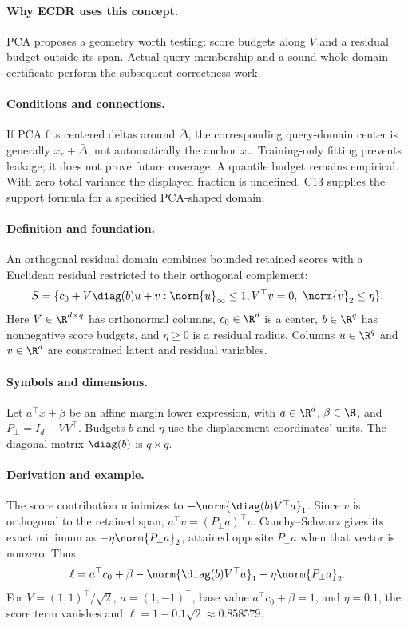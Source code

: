 \paragraph{Why ECDR uses this concept.}
PCA proposes a geometry worth testing: score budgets along $V$ and a residual budget outside its span. Actual query membership and a sound whole-domain certificate perform the subsequent correctness work.
\paragraph{Conditions and connections.}
If PCA fits centered deltas around $\bar\Delta$, the corresponding query-domain center is generally $x_r+\bar\Delta$, not automatically the anchor $x_r$. Training-only fitting prevents leakage; it does not prove future coverage. A quantile budget remains empirical. With zero total variance the displayed fraction is undefined. C13 supplies the support formula for a specified PCA-shaped domain.

\paragraph{Definition and foundation.}
An orthogonal residual domain combines bounded retained scores with a Euclidean residual restricted to their orthogonal complement:
\[
 S=\{c_0+V\diag(b)u+v:\norm{u}_\infty\le1,
          V^\top v=0,\ \norm{v}_2\le\eta\}.
\]
Here $V\in\R^{d\times q}$ has orthonormal columns, $c_0\in\R^d$ is a center, $b\in\R^q$ has nonnegative score budgets, and $\eta\ge0$ is a residual radius. Columns $u\in\R^q$ and $v\in\R^d$ are constrained latent and residual variables.
\paragraph{Symbols and dimensions.}
Let $a^\top x+\beta$ be an affine margin lower expression, with $a\in\R^d$, $\beta\in\R$, and $P_\perp=I_d-VV^\top$. Budgets $b$ and $\eta$ use the displacement coordinates' units. The diagonal matrix $\diag(b)$ is $q\times q$.
\paragraph{Derivation and example.}
The score contribution minimizes to $-\norm{\diag(b)V^\top a}_1$. Since $v$ is orthogonal to the retained span, $a^\top v=(P_\perp a)^\top v$. Cauchy--Schwarz gives its exact minimum as $-\eta\norm{P_\perp a}_2$, attained opposite $P_\perp a$ when that vector is nonzero. Thus
\[
 \ell=a^\top c_0+\beta-\norm{\diag(b)V^\top a}_1
                  -\eta\norm{P_\perp a}_2.
\]
For $V=(1,1)^\top/\sqrt2$, $a=(1,-1)^\top$, base value $a^\top c_0+\beta=1$, and $\eta=0.1$, the score term vanishes and $\ell=1-0.1\sqrt2\approx0.858579$.
